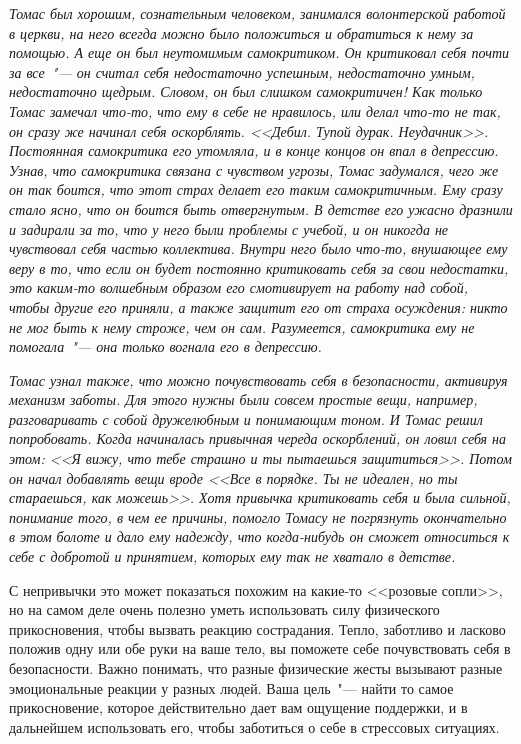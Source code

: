 \vspace{2ex}

\textit{Томас был хорошим, сознательным человеком, занимался волонтерской работой в церкви, на него всегда можно было положиться и обратиться к нему за помощью. А еще он был неутомимым самокритиком. Он критиковал себя почти за все~"--- он считал себя недостаточно успешным, недостаточно умным, недостаточно щедрым. Словом, он был слишком самокритичен! Как только Томас замечал что-то, что ему в себе не нравилось, или делал что-то не так, он сразу же начинал себя оскорблять. <<Дебил. Тупой дурак. Неудачник>>. Постоянная самокритика его утомляла, и в конце концов он впал в депрессию. Узнав, что самокритика связана с чувством угрозы, Томас задумался, чего же он так боится, что этот страх делает его таким самокритичным. Ему сразу стало ясно, что он боится быть отвергнутым. В детстве его ужасно дразнили и задирали за то, что у него были проблемы с учебой, и он никогда не чувствовал себя частью коллектива. Внутри него было что-то, внушающее ему веру в то, что если он будет постоянно критиковать себя за свои недостатки, это каким-то волшебным образом его смотивирует на работу над собой, чтобы другие его приняли, а также защитит его от страха осуждения: никто не мог быть к нему строже, чем он сам. Разумеется, самокритика ему не помогала~"--- она только вогнала его в депрессию.}
 
\textit{Томас узнал также, что можно почувствовать себя в безопасности, активируя механизм заботы. Для этого нужны были совсем простые вещи, например, разговаривать с собой дружелюбным и понимающим тоном. И Томас решил попробовать. Когда начиналась привычная череда оскорблений, он ловил себя на этом: <<Я вижу, что тебе страшно и ты пытаешься защититься>>. Потом он начал добавлять вещи вроде <<Все в порядке. Ты не идеален, но ты стараешься, как можешь>>. Хотя привычка критиковать себя и была сильной, понимание того, в чем ее причины, помогло Томасу не погрязнуть окончательно в этом болоте и дало ему надежду, что когда-нибудь он сможет относиться к себе с добротой и принятием, которых ему так не хватало в детстве.}

\label{IP:Soothing_Touch}

С непривычки это может показаться похожим на какие-то <<розовые сопли>>, но на самом деле очень полезно уметь использовать силу физического прикосновения, чтобы вызвать реакцию сострадания. Тепло, заботливо и ласково положив одну или обе руки на ваше тело, вы поможете себе почувствовать себя в безопасности. Важно понимать, что разные физические жесты вызывают разные эмоциональные реакции у разных людей. Ваша цель~"--- найти то самое прикосновение, которое действительно дает вам ощущение поддержки, и в дальнейшем использовать его, чтобы заботиться о себе в стрессовых ситуациях. 

